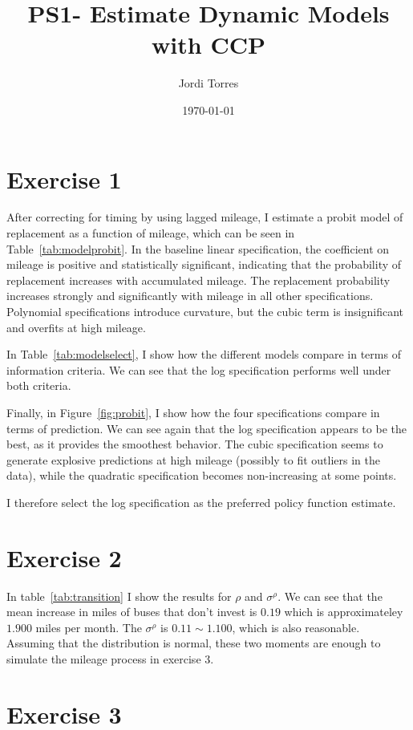 \documentclass{article}
\begin{document}
\title{PS1- Estimate Dynamic Models with CCP}
\author{Jordi Torres}
\date{\today}


\maketitle

\section*{Exercise 1}
After correcting for timing by using lagged mileage, I estimate a probit model of replacement as a function of mileage, which can be seen in Table~\ref{tab:modelprobit}. In the baseline linear specification, the coefficient on mileage is positive and statistically significant, indicating that the probability of replacement increases with accumulated mileage. The replacement probability increases strongly and significantly with mileage in all other specifications. Polynomial specifications introduce curvature, but the cubic term is insignificant and overfits at high mileage. 

In Table~\ref{tab:modelselect}, I show how the different models compare in terms of information criteria. We can see that the log specification performs well under both criteria. 

Finally, in Figure~\ref{fig:probit}, I show how the four specifications compare in terms of prediction. We can see again that the log specification appears to be the best, as it provides the smoothest behavior. The cubic specification seems to generate explosive predictions at high mileage (possibly to fit outliers in the data), while the quadratic specification becomes non-increasing at some points.

I therefore select the log specification as the preferred policy function estimate.

\section*{Exercise 2}
In table~\ref{tab:transition} I show the results for $\rho$ and $\sigma^{\rho}$. We can see that the mean increase in miles of buses that don't invest is $0.19$ which is approximateley $1.900$ miles per month. The $\sigma^{\rho}$ is  $0.11\sim 1.100$, which is also reasonable. Assuming that the distribution is normal, these two moments are enough to simulate the mileage process in exercise 3.

\section*{Exercise 3}
\end{document}
